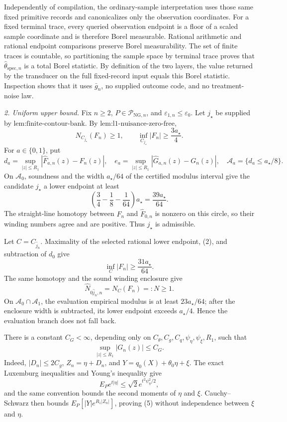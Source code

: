 Independently of compilation, the ordinary-sample interpretation uses those same fixed primitive records and canonicalizes only the observation coordinates.  For a fixed terminal trace, every queried observation endpoint is a floor of a scaled sample coordinate and is therefore Borel measurable.  Rational arithmetic and rational endpoint comparisons preserve Borel measurability.  The set of finite traces is countable, so partitioning the sample space by terminal trace proves that \(\widehat\theta_{\mathrm{spec},n}\) is a total Borel statistic.  By definition of the two layers, the value returned by the transducer on the full fixed-record input equals this Borel statistic.  Inspection shows that it uses \(\bar g_n\), no supplied outcome code, and no treatment-noise law.

\emph{2. Uniform upper bound.}  Fix \(n\ge2\), \(P\in\mathcal P_{\mathrm{NG},n}\), and \(\varepsilon_{1,n}\le\varepsilon_0\).  Let \(j_{\star}\) be supplied by \(\text{lem:finite-contour-bank}\).  By \(\text{lem:l1-nuisance-zero-free}\),
\[
 N_{C_{j_{\star}}}(F_n)\ge1,
 \qquad
 \inf_{C_{j_{\star}}}|F_n|\ge\frac{3a_{\star}}4. \tag{1}
\]
For \(a\in\{0,1\}\), put
\[
 d_a=\sup_{|z|\le R_1}|\widehat F_{a,n}(z)-F_n(z)|,
 \quad
 e_a=\sup_{|z|\le R_1}|\widehat G_{a,n}(z)-G_n(z)|,
 \quad
 \mathcal A_a=\{d_a\le a_{\star}/8\}.
\]
On \(\mathcal A_0\), soundness and the width \(a_{\star}/64\) of the certified modulus interval give the candidate \(j_{\star}\) a lower endpoint at least
\[
 \left(\frac34-\frac18-\frac1{64}\right)a_{\star}
 =\frac{39a_{\star}}{64}. \tag{2}
\]
The straight-line homotopy between \(F_n\) and \(\widehat F_{0,n}\) is nonzero on this circle, so their winding numbers agree and are positive.  Thus \(j_{\star}\) is admissible.

Let \(C=C_{\widehat j_n}\).  Maximality of the selected rational lower endpoint, (2), and subtraction of \(d_0\) give
\[
 \inf_C|F_n|\ge\frac{31a_{\star}}{64}. \tag{3}
\]
The same homotopy and the sound winding enclosure give
\[
 \widehat N_{0\widehat j_n,n}=N_C(F_n)=:N\ge1. \tag{4}
\]
On \(\mathcal A_0\cap\mathcal A_1\), the evaluation empirical modulus is at least \(23a_{\star}/64\); after the enclosure width is subtracted, its lower endpoint exceeds \(a_{\star}/4\).  Hence the evaluation branch does not fall back.

There is a constant \(C_G<\infty\), depending only on \(C_{\theta},C_g,C_q,\psi_{\eta},\psi_{\xi},R_1\), such that
\[
 \sup_{|z|\le R_1}|G_n(z)|\le C_G. \tag{5}
\]
Indeed, \(|D_n|\le2C_g\), \(Z_n=\eta+D_n\), and \(Y=q_0(X)+\theta_0\eta+\xi\).  The exact Luxemburg inequalities and Young's inequality give
\[
 E_Pe^{t|\eta|}\le\sqrt2e^{t^2\psi_{\eta}^2/2},
\]
and the same convention bounds the second moments of \(\eta\) and \(\xi\).  Cauchy--Schwarz then bounds \(E_P[|Y|e^{R_1|Z_n|}]\), proving (5) without independence between \(\xi\) and \(\eta\).

